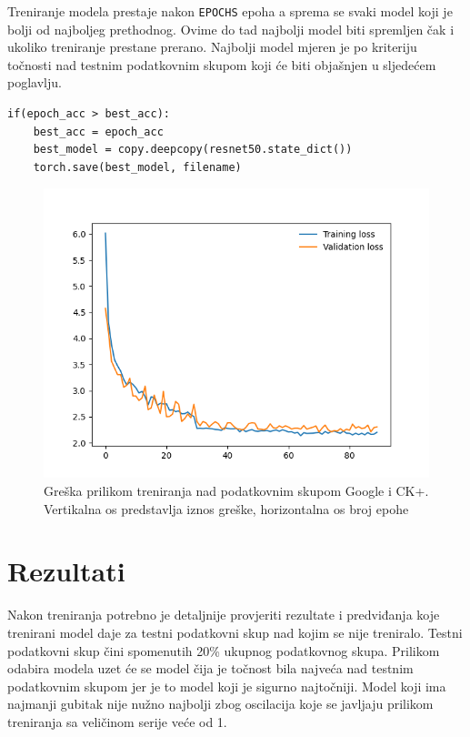 \documentclass[times, utf8, zavrsni,numeric,pstricks]{fer}
\begin{document}
Treniranje modela prestaje nakon \lstinline"EPOCHS" epoha a sprema se svaki model koji je bolji od najboljeg prethodnog. Ovime do tad najbolji model biti spremljen čak i ukoliko treniranje prestane prerano. Najbolji model mjeren je po kriteriju točnosti nad testnim podatkovnim skupom koji će biti objašnjen u sljedećem poglavlju.
\begin{Verbatim}[fontsize=\small]
if(epoch_acc > best_acc):
	best_acc = epoch_acc
	best_model = copy.deepcopy(resnet50.state_dict())
	torch.save(best_model, filename)
\end{Verbatim}

\begin{figure}[H]
	\centering
	\includegraphics[width=\linewidth, height=0.3\paperheight, keepaspectratio]{val_ck.png}
	\caption{Greška prilikom treniranja nad podatkovnim skupom Google i CK+. Vertikalna os predstavlja iznos greške, horizontalna os broj epohe}
	\label{loss_ck}
\end{figure}

\chapter{Rezultati}

Nakon treniranja potrebno je detaljnije provjeriti rezultate i predviđanja koje trenirani model daje za testni podatkovni skup nad kojim se nije treniralo. Testni podatkovni skup čini spomenutih 20\% ukupnog podatkovnog skupa. Prilikom odabira modela uzet će se model čija je točnost bila najveća nad testnim podatkovnim skupom jer je to model koji je sigurno najtočniji. Model koji ima najmanji gubitak nije nužno najbolji zbog oscilacija koje se javljaju prilikom treniranja sa veličinom serije veće od 1. 
\end{document}
